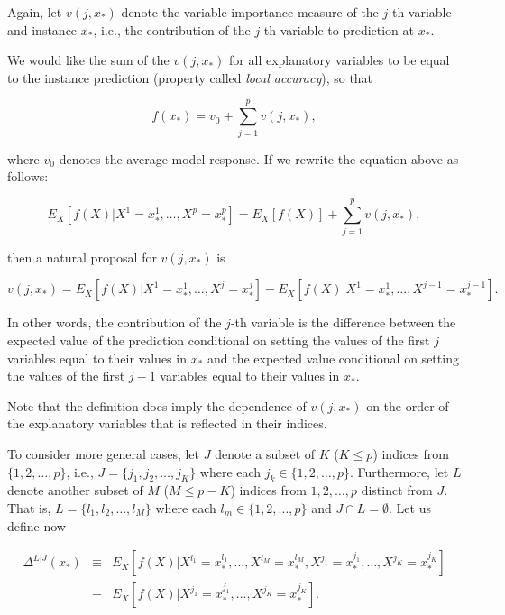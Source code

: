 \documentclass[]{krantz}
\begin{document}
Again, let \(v(j, x_*)\) denote the variable-importance measure of the \(j\)-th variable and instance \(x_*\), i.e., the contribution of the \(j\)-th variable to prediction at \(x_*\).

We would like the sum of the \(v(j, x_*)\) for all explanatory variables to be equal to the instance prediction (property called \emph{local accuracy}), so that

\begin{equation}
f(x_*) = v_0 + \sum_{j=1}^p v(j, x_*),
\label{eq:generalBreakDownLocalAccuracy}
\end{equation}

where \(v_0\) denotes the average model response. If we rewrite the equation above as follows:

\begin{equation}
E_X[f(X)|X^1 = x^1_*, \ldots, X^p = x^p_*] = E_X[f(X)] + \sum_{j=1}^p v(j, x_*),
\end{equation}

then a natural proposal for \(v(j, x_*)\) is

\begin{equation}
v(j, x_*) = E_X[f(X) | X^1 = x^1_*, \ldots, X^j = x^j_*] - E_X[f(X) | X^1 = x^1_*, \ldots, X^{j-1} = x^{j-1}_*]. 
\label{eq:generalBreakDownProposition}
\end{equation}

In other words, the contribution of the \(j\)-th variable is the difference between the expected value of the prediction conditional on setting the values of the first \(j\) variables equal to their values in \(x_*\) and the expected value conditional on setting the values of the first \(j-1\) variables equal to their values in \(x_*\).

Note that the definition does imply the dependence of \(v(j, x_*)\) on the order of the explanatory variables that is reflected in their indices.

To consider more general cases, let \(J\) denote a subset of \(K\) (\(K\leq p\)) indices from \(\{1,2,\ldots,p\}\), i.e., \(J=\{j_1,j_2,\ldots,j_K\}\) where each \(j_k \in \{1,2,\ldots,p\}\). Furthermore, let \(L\) denote another subset of \(M\) (\(M \leq p-K\)) indices from \({1,2,\ldots,p}\) distinct from \(J\). That is, \(L=\{l_1,l_2,\ldots,l_M\}\) where each \(l_m \in \{1,2,\ldots,p\}\) and \(J \cap L = \emptyset\). Let us define now

\begin{eqnarray}
\Delta^{L|J}(x_*) &\equiv& E_X[f(X) | X^{l_1} = x_*^{l_1},\ldots,X^{l_M} = x_*^{l_M},X^{j_1} = x_*^{j_1},\ldots,X^{j_K} = x_*^{j_K}]\\
&-& E_X[f(X) | X^{j_1} = x_*^{j_1},\ldots,X^{j_K} = x_*^{j_K}].
\end{eqnarray}
\end{document}
